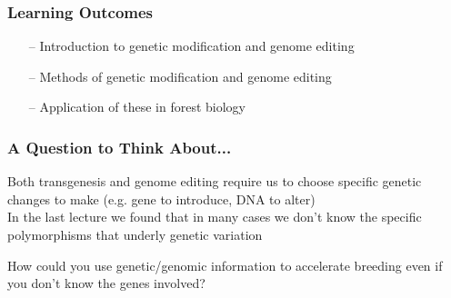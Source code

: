 \documentclass[xcolor=dvipsnames]{beamer}
\begin{document}
\begin{frame}
	
	\frametitle{Learning Outcomes}
	

	\begin{itemize}
	\item[--] Introduction to genetic modification and genome editing
	\item[--] Methods of genetic modification and genome editing
	\item[--] Application of these in forest biology	\end{itemize}

\end{frame}


\begin{frame}
	\frametitle{A Question to Think About...}
	
	Both transgenesis and genome editing require us to choose specific genetic changes to make (e.g. gene to introduce, DNA to alter)\\
	\vspace{15pt}
	In the last lecture we found that in many cases we don't know the specific polymorphisms that underly genetic variation\\
	
	\vspace{20pt}

	\large How could you use genetic/genomic information to accelerate breeding even if you don't know the genes involved?
	
\end{frame}
\end{document}
